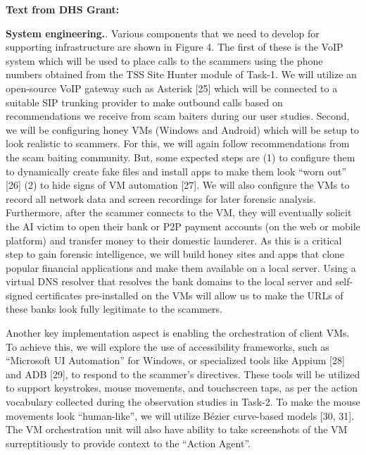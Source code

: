 \textbf{Text from DHS Grant:}

\textbf{System engineering.}. Various components that we need to develop for supporting
infrastructure are shown in Figure 4. The first of these is the VoIP system which will be used to place
calls to the scammers using the phone numbers obtained from the TSS Site Hunter module of Task-1. We
will utilize an open-source VoIP gateway such as Asterisk [25] which will be connected to a suitable SIP
trunking provider to make outbound calls based on recommendations we receive from scam baiters during
our user studies. Second, we will be configuring honey VMs (Windows and Android) which will be setup
to look realistic to scammers. For this, we will again follow recommendations from the scam baiting
community. But, some expected steps are (1) to configure them to dynamically create fake files and
install apps to make them look “worn out” [26] (2) to hide signs of VM automation [27]. We will also
configure the VMs to record all network data and screen recordings for later forensic analysis.
Furthermore, after the scammer connects to the VM, they will eventually solicit the AI victim to open
their bank or P2P payment accounts (on the web or mobile platform) and transfer money to their domestic
launderer. As this is a critical step to gain forensic intelligence, we will build honey sites and apps that
clone popular financial applications and make them available on a local server. Using a virtual DNS
resolver that resolves the bank domains to the local server and self-signed certificates pre-installed on the
VMs will allow us to make the URLs of these banks look fully legitimate to the scammers.


Another key implementation aspect is enabling the orchestration of client VMs. To achieve this, we will
explore the use of accessibility frameworks, such as “Microsoft UI Automation” for Windows, or
specialized tools like Appium [28] and ADB [29], to respond to the scammer’s directives. These tools
will be utilized to support keystrokes, mouse movements, and touchscreen taps, as per the action
vocabulary collected during the observation studies in Task-2. To make the mouse movements look
“human-like”, we will utilize Bézier curve-based models [30, 31]. The VM orchestration unit will also
have ability to take screenshots of the VM surreptitiously to provide context to the “Action Agent”.


